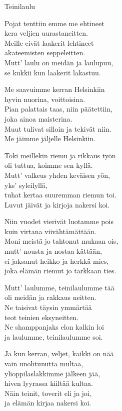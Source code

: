 \begin{song}{Teinilaulu}

	
	Pojat tenttiin emme me ehtineet\\
	kera veljien uurastaneitten.\\
	Meille eivät laakerit lehtineet\\
	akateemisten seppeleitten.\\
	Mutt' laulu on meidän ja laulupuu,\\
	se kukkii kun laakerit lakastuu.

	Me saavuimme kerran Helsinkiin\\
	hyvin nuorina, voittoisina.\\
	Pian palattais taas, niin päätettiin,\\
	joka ainoa maisterina.\\
	Muut tulivat silloin ja tekivät niin.\\
	Me jäimme jäljelle Helsinkiin.

	Toki meillekin riemu ja rikkaus työn\\
	oli tuttua, koimme sen kyllä.\\
	Mutt' valkeus yhden keväisen yön,\\
	yks' syleilyllä,\\
	tuhat kertaa suuremman riemun toi.\\
	Luvut jäivät ja kirjoja nakersi koi.

	Niin vuodet vierivät luotamme pois\\
	kuin virtana viivähtämättään.\\
	Moni meistä jo tahtonut mukaan ois,\\
	mutt' nousta ja nostaa kättään,\\
	ei jaksanut heikko ja herkkä mies,\\
	joka elämän riemut jo tarkkaan ties.

	Mutt' laulumme, teinilaulumme tää\\
	oli meidän ja rakkaus neitten.\\
	Ne taisivat täysin ymmärtää\\
	teot teinien eksyneitten.\\
	Ne shamppanjaks elon kalkin loi\\
	ja laulumme, teinilaulumme soi.

	Ja kun kerran, veljet, kaikki on nää\\
	vain unohtunutta multaa,\\
	ylioppilaslakkimme jälkeen jää,\\
	hiven lyyrassa kiiltää kultaa.\\
	Näin teinit, toverit eli ja joi,\\
	ja elämän kirjaa nakersi koi.
	
\end{song}
